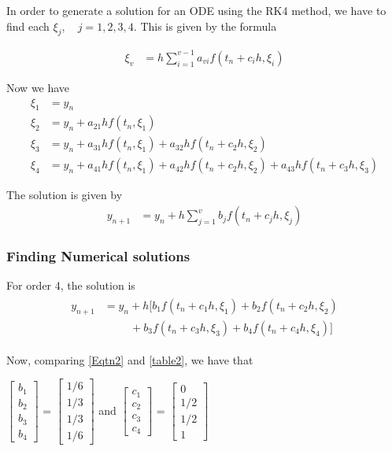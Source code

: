 \documentclass[12pt,a4paper]{article}
\begin{document}
\noindent
In order to generate a solution for an ODE using the RK4 method, we have to find each $\xi_j, \quad j=1,2,3,4$. This is given by the formula 

\begin{align*}
\xi_v &= h \sum_{i=1}^{v-1}a_{vi}f(t_n + c_ih , \xi_i ) 
\end{align*}

\noindent
Now we have 
\begin{align}\label{xi1}
\xi_1 &= y_n \\ \label{xi2}
\xi_2 &= y_n + a_{21}h f (t_n, \xi_1 ) \\ \label{xi3}
\xi_3 &= y_n + a_{31}h f (t_n, \xi_1 ) + a_{32}h f (t_n + c_2h, \xi_2 ) \\ \label{xi4}
\xi_4 &= y_n + a_{41}h f(t_n, \xi_1 ) + a_{42}h f (t_n + c_2h, \xi_2 ) + a_{43}h f(t_n + c_3h, \xi_3 )  
\end{align}

\noindent
The solution is given by
\begin{align*}
y_{n+1} &= y_n + h \sum_{j=1}^{v}b_jf(t_n + c_jh , \xi_j ) 
\end{align*}

\subsubsection{Finding Numerical solutions}
\noindent
For order 4, the solution is
\begin{align*}
\begin{split}
y_{n+1} &= y_n + h [b_1f(t_n + c_1h , \xi_1 ) + b_2f(t_n + c_2h , \xi_2 ) \\
&\hspace{1cm}+ b_3f(t_n + c_3h , \xi_3 )+ b_4f(t_n + c_4h , \xi_4 )]
\end{split}
\end{align*}

Now, comparing \eqref{Eqtn2} and \ref{table2}, we have that 
 
$
\begin{bmatrix}
b_1 \\
b_2 \\
b_3 \\
b_4
\end{bmatrix}
$ = 
$
\begin{bmatrix}
1/6 \\
1/3 \\
1/3 \\
1/6
\end{bmatrix}
$
\qquad and  \qquad 
$
\begin{bmatrix}
c_1 \\
c_2 \\
c_3 \\
c_4
\end{bmatrix}
$ =
$
\begin{bmatrix}
0 \\
1/2 \\
1/2\\
1
\end{bmatrix}
$
\end{document}
